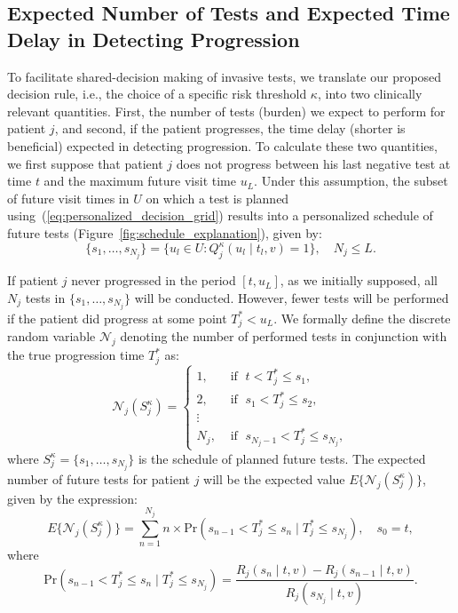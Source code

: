 \documentclass[useAMS, usenatbib, referee]{biom}
\begin{document}
\subsection{Expected Number of Tests and Expected Time Delay in Detecting Progression}
\label{subsec:exp_delay_estimation}
To facilitate shared-decision making of invasive tests, we translate our proposed decision rule, i.e., the choice of a specific risk threshold $\kappa$, into two clinically relevant quantities. First, the number of tests (burden) we expect to perform for patient $j$, and second, if the patient progresses, the time delay (shorter is beneficial) expected in detecting progression. To calculate these two quantities, we first suppose that patient $j$ does not progress between his last negative test at time $t$ and the maximum future visit time $u_L$. Under this assumption, the subset of future visit times in $U$ on which a test is planned using~(\ref{eq:personalized_decision_grid}) results into a personalized schedule of future tests (Figure~\ref{fig:schedule_explanation}), given by:
\begin{equation}
\label{eq:personalized_schedule_grid}
\{s_1, \ldots, s_{N_j}\} = \big\{ u_l \in U : Q_j^\kappa(u_l \mid t_l, v) = 1 \big\}, \quad N_j \leq L.
\end{equation}

If patient $j$ never progressed in the period $[t, u_L]$, as we initially supposed, all $N_j$ tests in $\{s_1, \ldots, s_{N_j}\}$ will be conducted. However, fewer tests will be performed if the patient did progress at some point $T_j^* < u_L$. We formally define the discrete random variable $\mathcal{N}_j$ denoting the number of performed tests in conjunction with the true progression time $T_j^*$ as:
\[
\mathcal{N}_j (S^\kappa_j) = \left \{
\begin{array}{ll}
1, & \mbox{ if } \; t < T^*_j \leq s_1,\\
2, & \mbox{ if } \; s_1 < T^*_j \leq s_2,\\
\vdots&\\
N_j, & \mbox{ if } \; s_{N_j-1} < T^*_j \leq s_{N_j},
\end{array}
\right.
\]
where $S^\kappa_j = \{s_1, \ldots, s_{N_j}\}$ is the schedule of planned future tests. The expected number of future tests for patient $j$ will be the expected value $E \big \{\mathcal N_j(S^\kappa_j)\big\}$, given by the expression:
\begin{equation*}
\label{eq:exp_tests}
E \big \{\mathcal N_j(S^\kappa_j)\big\} = \sum_{n = 1}^{N_j} n \times \mbox{Pr}(s_{n-1} < T^*_j \leq s_n \mid T^*_j \leq s_{N_j}), \quad s_0 = t,
\end{equation*}
where 
\begin{equation*}
\mbox{Pr}(s_{n-1} < T^*_j \leq s_n \mid T^*_j \leq s_{N_j}) = \frac{R_j(s_n \mid t, v) - R_j(s_{n-1} \mid t, v)}{R_j(s_{N_j} \mid t, v)}.
\end{equation*}
\end{document}
